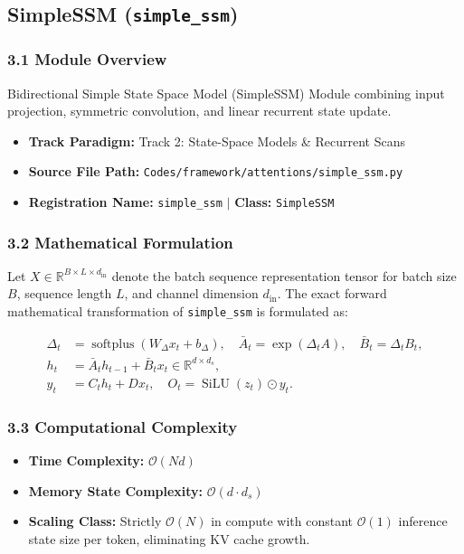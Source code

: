 \subsection{SimpleSSM (\texttt{simple\_ssm})}
\label{sec:app_module_simple_ssm}

\subsubsection*{3.1 Module Overview}
Bidirectional Simple State Space Model (SimpleSSM) Module combining input projection, symmetric convolution, and linear recurrent state update.
\begin{itemize}
    \item \textbf{Track Paradigm:} Track 2: State-Space Models \& Recurrent Scans
    \item \textbf{Source File Path:} \texttt{Codes/framework/attentions/simple\_ssm.py}
    \item \textbf{Registration Name:} \texttt{simple\_ssm} $\mid$ \textbf{Class:} \texttt{SimpleSSM}
\end{itemize}

\subsubsection*{3.2 Mathematical Formulation}
Let $X \in \mathbb{R}^{B \times L \times d_{\text{in}}}$ denote the batch sequence representation tensor for batch size $B$, sequence length $L$, and channel dimension $d_{\text{in}}$. The exact forward mathematical transformation of \texttt{simple\_ssm} is formulated as:

\begin{align}
\Delta_t &= \operatorname{softplus}(W_\Delta x_t + b_\Delta), \quad \bar{A}_t = \exp(\Delta_t A), \quad \bar{B}_t = \Delta_t B_t, \\
h_t &= \bar{A}_t h_{t-1} + \bar{B}_t x_t \in \mathbb{R}^{d \times d_s}, \\
y_t &= C_t h_t + D x_t, \quad O_t = \operatorname{SiLU}(z_t) \odot y_t.
\end{align}


\subsubsection*{3.3 Computational Complexity}
\begin{itemize}
    \item \textbf{Time Complexity:} $\mathcal{O}(N d)$
    \item \textbf{Memory State Complexity:} $\mathcal{O}(d \cdot d_s)$
    \item \textbf{Scaling Class:} Strictly $\mathcal{O}(N)$ in compute with constant $\mathcal{O}(1)$ inference state size per token, eliminating KV cache growth.
\end{itemize}

